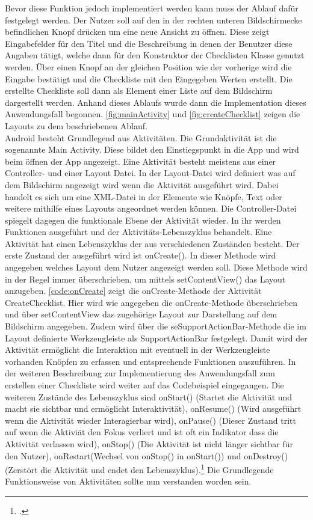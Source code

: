Bevor diese Funktion jedoch implementiert werden kann muss der Ablauf dafür festgelegt werden. Der Nutzer soll auf den in der rechten unteren Bildschirmecke befindlichen Knopf drücken um eine neue Ansicht zu öffnen. Diese zeigt Eingabefelder für den Titel und die Beschreibung in denen der Benutzer diese Angaben tätigt, welche dann für den Konstruktor der Checklisten Klasse genutzt werden. Über einen Knopf an der gleichen Position wie der vorherige wird die Eingabe bestätigt und die Checkliste mit den Eingegeben Werten erstellt. Die erstellte Checkliste soll dann als Element einer Liste auf dem Bildschirm dargestellt werden. Anhand dieses Ablaufs wurde dann die Implementation dieses Anwendungsfall begonnen. \autoref{fig:mainActivity} und \autoref{fig:createChecklist} zeigen die Layouts zu dem beschriebenen Ablauf.\\
Android besteht Grundlegend aus Aktivitäten. Die Grundaktivität ist die sogenannte \glqq Main Activity\grqq. Diese bildet den Einstiegspunkt in die App und wird beim öffnen der App angezeigt. Eine Aktivität besteht meistens aus einer \grqq Controller-\grqq{} und einer Layout Datei. In der Layout-Datei wird definiert was auf dem Bildschirm angezeigt wird wenn die Aktivität ausgeführt wird. Dabei handelt es sich um eine XML-Datei in der Elemente wie Knöpfe, Text oder weitere mithilfe eines Layouts angeordnet werden können. Die Controller-Datei spiegelt dagegen die funktionale Ebene der Aktivität wieder. In ihr werden Funktionen ausgeführt und der Aktivitäts-Lebenszyklus behandelt. Eine Aktivität hat einen Lebenszyklus der aus verschiedenen Zuständen besteht. Der erste Zustand der ausgeführt wird ist \glqq onCreate()\grqq. In dieser Methode wird angegeben welches Layout dem Nutzer angezeigt werden soll. Diese Methode wird in der Regel immer überschrieben, um mittels setContentView() das Layout anzugeben. \autoref{code:onCreate} zeigt die onCreate-Methode der Aktivität CreateChecklist. Hier wird wie angegeben die onCreate-Methode überschrieben und über setContentView das zugehörige Layout zur Darstellung auf dem Bildschirm angegeben. Zudem wird über die seSupportActionBar-Methode die im Layout definierte Werkzeugleiste als SupportActionBar festgelegt. Damit wird der Aktivität ermöglicht die Interaktion mit eventuell in der Werkzeugleiste vorhanden Knöpfen zu erfassen und entsprechende Funktionen auszuführen. In der weiteren Beschreibung zur Implementierung des Anwendungsfall zum erstellen einer Checkliste wird weiter auf das Codebeispiel eingegangen. Die weiteren Zustände des Lebenszyklus sind onStart() (Startet die Aktivität und macht sie sichtbar und ermöglicht Interaktivität), onResume() (Wird ausgeführt wenn die Aktivität wieder Interagierbar wird), onPause() (Dieser Zustand tritt auf wenn die Aktiviät den Fokus verliert und ist oft ein Indikator dass die Aktivität verlassen wird), onStop() (Die Aktivität ist nicht länger sichtbar für den Nutzer), onRestart(Wechsel von onStop() in onStart()) und onDestroy() (Zerstört die Aktivität und endet den Lebenszyklus).\footcite{Aktivitäten.2021} Die Grundlegende Funktionsweise von Aktivitäten sollte nun verstanden worden sein.\\
